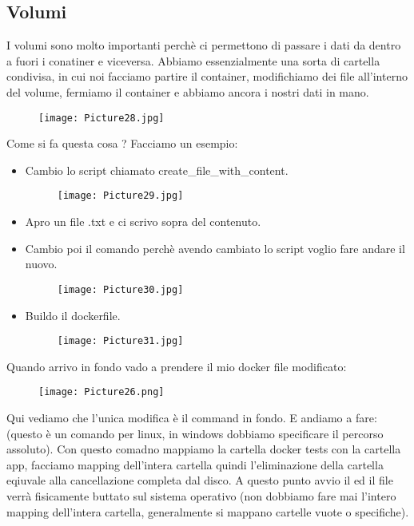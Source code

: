 \documentclass[a4paper,12pt]{article}
\begin{document}
\subsection{Volumi}
I volumi sono molto importanti perchè ci permettono di passare i dati da dentro a fuori i conatiner e viceversa. Abbiamo essenzialmente una sorta di cartella condivisa, in cui noi facciamo partire il container, modifichiamo dei file all'interno del volume,
fermiamo il container e abbiamo ancora i nostri dati in mano.
\begin{figure}[H]
    \centering
    \texttt{[image: Picture28.jpg]}
    \label{etichetta50}
\end{figure}
\noindent Come si fa questa cosa ? 
\newline
Facciamo un esempio:
\begin{itemize}
    \item Cambio lo script chiamato create\_file\_with\_content.
    \begin{figure}[H]
        \centering
        \texttt{[image: Picture29.jpg]}
    \label{etichetta51}
\end{figure}
    \item Apro un file .txt e ci scrivo sopra del contenuto.
    \item Cambio poi il comando perchè avendo cambiato lo script voglio fare andare il nuovo.
    \begin{figure}[H]
        \centering
        \texttt{[image: Picture30.jpg]}
        \label{etichetta52}
    \end{figure}
    \item Buildo il dockerfile.
    \begin{figure}[H]
        \centering
        \texttt{[image: Picture31.jpg]}
        \label{etichetta53}
    \end{figure}
\end{itemize}
Quando arrivo in fondo vado a prendere il mio docker file modificato:
\begin{figure}[H]
    \centering
    \texttt{[image: Picture26.png]}
\end{figure}
\noindent Qui vediamo che l'unica modifica è il command in fondo. E andiamo a fare: 
\newline
{} (questo è un comando per linux, in windows dobbiamo specificare il percorso assoluto). Con questo comadno mappiamo la cartella docker tests con la cartella app, facciamo mapping dell'intera cartella quindi 
l'eliminazione della cartella eqiuvale alla cancellazione completa dal disco.
A questo punto avvio il  ed il file verrà fisicamente buttato sul sistema operativo (non dobbiamo fare mai l'intero mapping dell'intera cartella, generalmente si mappano cartelle vuote o specifiche).
\end{document}
